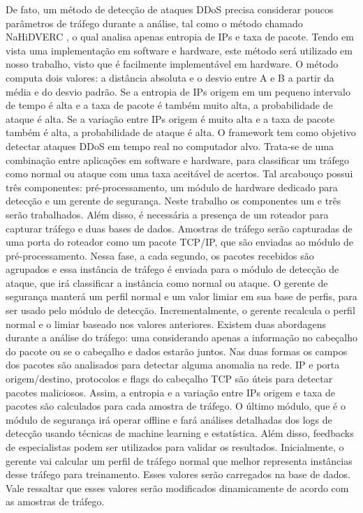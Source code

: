 De fato, um método de detecção de ataques DDoS precisa considerar poucos parâmetros de tráfego durante a análise, tal como o método chamado NaHiDVERC \cite{HOQUE201748}, o qual analisa apenas entropia de IPs e taxa de pacote. Tendo em vista uma implementação em software e hardware, este método será utilizado em nosso trabalho, visto que é facilmente implementável em hardware. O método computa dois valores: a distância absoluta e o desvio entre A e B a partir da média e do desvio padrão. Se a entropia de IPs origem em um pequeno intervalo de tempo é alta e a taxa de pacote é também muito alta, a probabilidade de ataque é alta. Se a variação entre IPs origem é muito alta e a taxa de pacote também é alta, a probabilidade de ataque é alta. O framework tem como objetivo detectar ataques DDoS em tempo real no computador alvo. Trata-se de uma combinação entre aplicações em software e hardware, para classificar um tráfego como normal ou ataque com uma taxa aceitável de acertos. Tal arcabouço possui três componentes: pré-processamento, um módulo de hardware dedicado para detecção e um gerente de segurança. Neste trabalho os componentes um e três serão trabalhados. Além disso, é necessária a presença de um roteador para capturar tráfego e duas bases de dados. Amostras de tráfego serão capturadas de uma porta do roteador como um pacote TCP/IP, que são enviadas ao módulo de pré-processamento. Nessa fase, a cada segundo, os pacotes recebidos são agrupados e essa instância de tráfego é enviada para o módulo de detecção de ataque, que irá classificar a instância como normal ou ataque. O gerente de segurança manterá um perfil normal e um valor limiar em sua base de perfis, para ser usado pelo módulo de detecção. Incrementalmente, o gerente recalcula o perfil normal e o limiar baseado nos valores anteriores. 
Existem duas abordagens durante a análise do tráfego: uma considerando apenas a informação no cabeçalho do pacote ou se o cabeçalho e dados estarão juntos. Nas duas formas os campos dos pacotes são analisados para detectar alguma anomalia na rede. IP e porta origem/destino, protocolos e flags do cabeçalho TCP são úteis para detectar pacotes maliciosos. Assim, a entropia e a variação entre IPs origem e taxa de pacotes são calculados para cada amostra de tráfego.
O último módulo, que é o módulo de segurança irá operar offline e fará análises detalhadas dos logs de detecção usando técnicas de machine learning e estatística. Além disso, feedbacks de especialistas podem ser utilizados para validar os resultados. Inicialmente, o gerente vai calcular um perfil de tráfego normal que melhor representa instâncias desse tráfego para treinamento. Esses valores serão carregados na base de dados. Vale ressaltar que esses valores serão modificados dinamicamente de acordo com as amostras de tráfego. 

